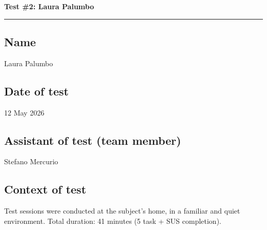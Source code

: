 ﻿\documentclass[11pt,a4paper]{article}
\begin{document}

\newpage
\begin{center}
  {\color{primaryColor}\large\bfseries Test \#2: Laura Palumbo}\\
  \vspace{0.1cm}
  \color{borderColor}\hrule
\end{center}

\vspace{0.5cm}

\subsection*{Name}
\begin{tcolorbox}[base]
Laura Palumbo
\end{tcolorbox}

\subsection*{Date of test}
\begin{tcolorbox}[base]
12 May 2026
\end{tcolorbox}

\subsection*{Assistant of test (team member)}
\begin{tcolorbox}[base]
Stefano Mercurio
\end{tcolorbox}

\subsection*{Context of test}
\begin{tcolorbox}[base]
Test sessions were conducted at the subject's home, in a
familiar and quiet environment. Total duration: 41 minutes
(5 task + SUS completion).
\end{tcolorbox}
\end{document}
